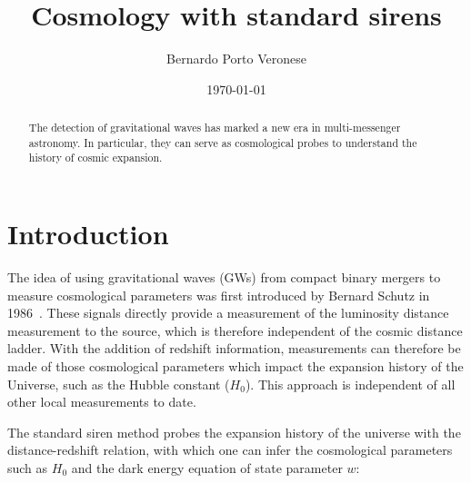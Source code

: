\documentclass[%
preprint,
nofootinbib,
 amsmath,amssymb,
 aps,
]{revtex4-2}
\begin{document}

\title{Cosmology with standard sirens}

\author{Bernardo Porto Veronese}
%


\date{\today}%

\begin{abstract}
	The detection of gravitational waves has marked a new era in multi-messenger astronomy.
	In particular, they can serve as cosmological probes to understand the history of cosmic expansion.
\end{abstract}

\maketitle


\section{\label{sec:introduction}Introduction} The idea of using gravitational waves (GWs) from compact binary mergers to measure
cosmological parameters was first introduced by Bernard Schutz in 1986~\cite{Schutz:1986gp}. These
signals directly provide a measurement of the luminosity distance measurement to the source, which
is therefore independent of the cosmic distance ladder. With the addition of redshift information,
measurements can therefore be made of those cosmological parameters which impact the expansion
history of the Universe, such as the Hubble constant ($H_0$). This approach is independent of all
other local measurements to date.

The standard siren method probes the expansion history of the universe with the distance-redshift
relation, with which one can infer the cosmological parameters such as $H_0$ and the dark energy
equation of state parameter $w$:~\cite{Hogg:1999ad}
\end{document}
